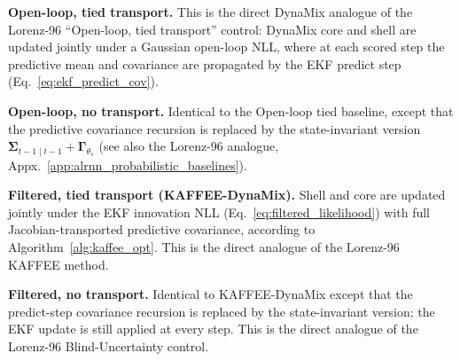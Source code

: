 \documentclass{article}
\theoremstyle{plain}
\theoremstyle{definition}
\theoremstyle{remark}
\begin{document}
\textbf{Open-loop, tied transport.} This is the direct DynaMix analogue of the Lorenz-96 ``Open-loop, tied transport'' control: DynaMix core and shell are updated jointly under a Gaussian open-loop NLL, where at each scored step the predictive mean and covariance are propagated by the EKF predict step (Eq.~\ref{eq:ekf_predict_cov}).

\textbf{Open-loop, no transport.} Identical to the Open-loop tied baseline, except that the predictive covariance recursion is replaced by the state-invariant version $\bm\Sigma_{t-1\mid t-1}+\bm\Gamma_{\theta_s}$ (see also the Lorenz-96 analogue, Appx.~\ref{app:alrnn_probabilistic_baselines}).

\textbf{Filtered, tied transport (KAFFEE-DynaMix).} Shell and core are updated jointly under the EKF innovation NLL (Eq.~\ref{eq:filtered_likelihood}) with full Jacobian-transported predictive covariance, according to Algorithm~\ref{alg:kaffee_opt}. This is the direct analogue of the Lorenz-96 KAFFEE method.

\textbf{Filtered, no transport.} Identical to KAFFEE-DynaMix except that the predict-step covariance recursion is replaced by the state-invariant version; the EKF update is still applied at every step. This is the direct analogue of the Lorenz-96 Blind-Uncertainty control.
\end{document}
